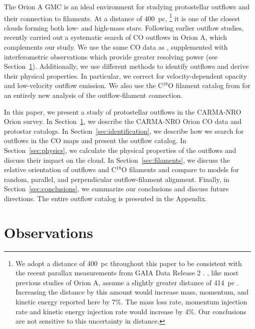 \documentclass[twocolumn]{aastex63}
\begin{document}
The Orion A GMC is an ideal environment for studying protostellar outflows and their connection to filaments. At a distance of 400~pc, \footnote{We adopt a distance of 400~pc throughout this paper to be consistent with the recent parallax measurements from GAIA Data Release 2 \citep{Kounkel18,Grossschedl18,Kuhn19}.  \citet{Tanabe19}, like most previous studies of Orion A, assume a slightly greater distance of 414~pc \citep{Menten07}. Increasing the distance by this amount would increase mass, momentum, and kinetic energy reported here by 7\%. The mass loss rate, momentum injection rate and kinetic energy injection rate would increase by 4\%. Our conclusions are not sensitive to this uncertainty in distance.} it is one of the closest clouds forming both low- and high-mass stars. Following earlier outflow studies, \citet{Tanabe19} recently carried out a systematic search of CO outflows in Orion A, which complements our study. We use the same CO data as \citet{Tanabe19}, supplemented with interferometric observations which provide greater resolving power (see Section~\ref{sec:observations}). Additionally, we use different methods to identify outflows and derive their physical properties. In particular, we correct for velocity-dependent opacity and low-velocity outflow emission. We also use the C$^{18}$O filament catalog from \citet{Suri19} for an entirely new analysis of the outflow-filament connection.

In this paper, we present a study of protostellar outflows in the CARMA-NRO Orion survey. In Section~\ref{sec:observations}, we describe the CARMA-NRO Orion CO data and protostar catalogs. In Section~\ref{sec:identification}, we describe how we search for outflows in the CO maps and present the outflow catalog. In Section~\ref{sec:physics}, we calculate the physical properties of the outflows and discuss their impact on the cloud. In Section~\ref{sec:filaments}, we discuss the relative orientation of outflows and C$^{18}$O filaments and compare to models for random, parallel, and perpendicular outflow-filament alignment. Finally, in Section~\ref{sec:conclusions}, we summarize our conclusions and discuss future directions. The entire outflow catalog is presented in the Appendix.


\section{Observations}\label{sec:observations}
\end{document}
